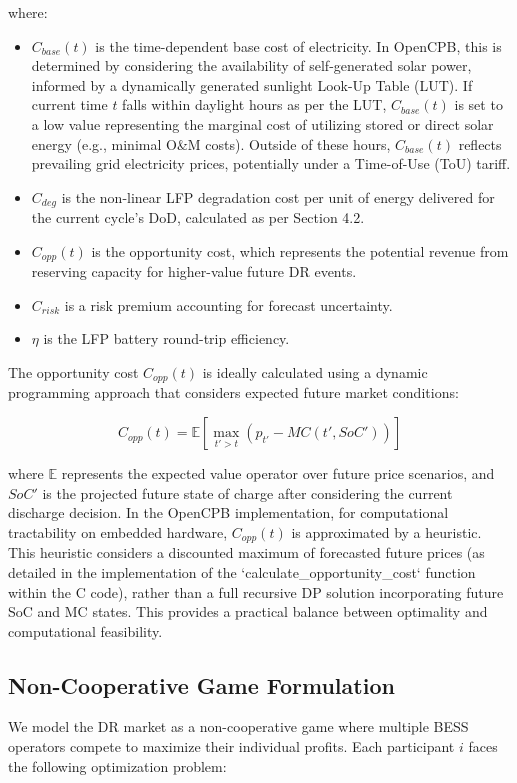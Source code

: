 \documentclass[11pt,a4paper]{article}
\begin{document}
where:
\begin{itemize}
    \item $C_{base}(t)$ is the time-dependent base cost of electricity. In OpenCPB, this is determined by considering the availability of self-generated solar power, informed by a dynamically generated sunlight Look-Up Table (LUT). If current time $t$ falls within daylight hours as per the LUT, $C_{base}(t)$ is set to a low value representing the marginal cost of utilizing stored or direct solar energy (e.g., minimal O\&M costs). Outside of these hours, $C_{base}(t)$ reflects prevailing grid electricity prices, potentially under a Time-of-Use (ToU) tariff.
    \item $C_{deg}$ is the non-linear LFP degradation cost per unit of energy delivered for the current cycle's DoD, calculated as per Section 4.2.
    \item $C_{opp}(t)$ is the opportunity cost, which represents the potential revenue from reserving capacity for higher-value future DR events.
    \item $C_{risk}$ is a risk premium accounting for forecast uncertainty.
    \item $\eta$ is the LFP battery round-trip efficiency.
\end{itemize}

The opportunity cost $C_{opp}(t)$ is ideally calculated using a dynamic programming approach that considers expected future market conditions:

\begin{equation}
C_{opp}(t) = \mathbb{E}\left[ \max_{t' > t} (p_{t'} - MC(t', SoC')) \right]
\end{equation}

where $\mathbb{E}$ represents the expected value operator over future price scenarios, and $SoC'$ is the projected future state of charge after considering the current discharge decision. In the OpenCPB implementation, for computational tractability on embedded hardware, $C_{opp}(t)$ is approximated by a heuristic. This heuristic considers a discounted maximum of forecasted future prices (as detailed in the implementation of the `calculate_opportunity_cost` function within the C code), rather than a full recursive DP solution incorporating future SoC and MC states. This provides a practical balance between optimality and computational feasibility.

\subsection{Non-Cooperative Game Formulation}
We model the DR market as a non-cooperative game where multiple BESS operators compete to maximize their individual profits. Each participant $i$ faces the following optimization problem:
\end{document}
